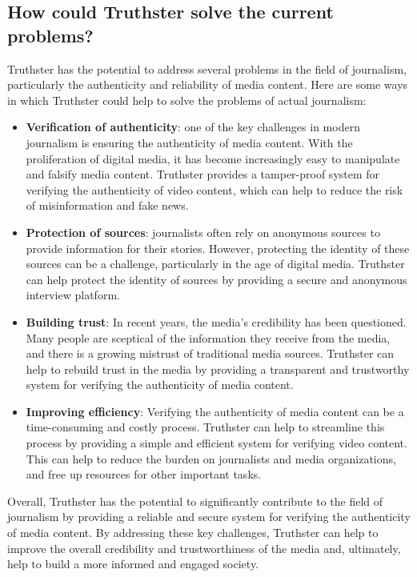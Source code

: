 \documentclass[target=mst,aauheader=]{thud}
\begin{document}
\subsection{How could Truthster solve the current problems?}

Truthster has the potential to address several problems in the field of journalism, particularly the authenticity and reliability of media content. Here are some ways in which Truthster could help to solve the problems of actual journalism:
\begin{itemize}

    \item \textbf{Verification of authenticity}: one of the key challenges in modern journalism is ensuring the authenticity of media content. With the proliferation of digital media, it has become increasingly easy to manipulate and falsify media content. Truthster provides a tamper-proof system for verifying the authenticity of video content, which can help to reduce the risk of misinformation and fake news.
    \item \textbf{Protection of sources}: journalists often rely on anonymous sources to provide information for their stories. However, protecting the identity of these sources can be a challenge, particularly in the age of digital media. Truthster can help protect the identity of sources by providing a secure and anonymous interview platform.
    \item \textbf{Building trust}: In recent years, the media's credibility has been questioned. Many people are sceptical of the information they receive from the media, and there is a growing mistrust of traditional media sources. Truthster can help to rebuild trust in the media by providing a transparent and trustworthy system for verifying the authenticity of media content.
    \item \textbf{Improving efficiency}: Verifying the authenticity of media content can be a time-consuming and costly process. Truthster can help to streamline this process by providing a simple and efficient system for verifying video content. This can help to reduce the burden on journalists and media organizations, and free up resources for other important tasks.

\end{itemize}

Overall, Truthster has the potential to significantly contribute to the field of journalism by providing a reliable and secure system for verifying the authenticity of media content. By addressing these key challenges, Truthster can help to improve the overall credibility and trustworthiness of the media and, ultimately, help to build a more informed and engaged society.
\end{document}
